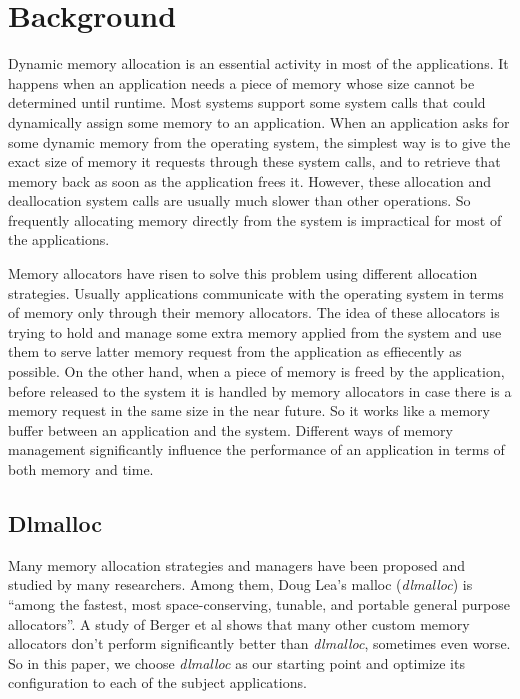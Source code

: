 \section{Background}

Dynamic memory allocation is an essential activity in most of the applications. It happens when an application needs a piece of memory whose size cannot be determined until runtime. Most systems support some system calls that could dynamically assign some memory to an application. When an application asks for some dynamic memory from the operating system, the simplest way is to give the exact size of memory it requests through these system calls, and to retrieve that memory back as soon as the application frees it. However, these allocation and deallocation system calls are usually much slower than other operations. So frequently allocating memory directly from the system is impractical for most of the applications. 

Memory allocators have risen to solve this problem using different allocation strategies. Usually applications communicate with the operating system in terms of memory only through their memory allocators. The idea of these allocators is trying to hold and manage some extra memory applied from the system and use them to serve latter memory request from the application as effiecently as possible. On the other hand, when a piece of memory is freed by the application, before released to the system it is handled by memory allocators in case there is a memory request in the same size in the near future. So it works like a memory buffer between an application and the system. Different ways of memory management significantly influence the performance of an application in terms of both memory and time.

\subsection{Dlmalloc}

Many memory allocation strategies and managers have been proposed and studied by many researchers. Among them, Doug Lea's malloc (\emph{dlmalloc}) \cite{lea1996memory} is ``among the fastest, most space-conserving, tunable, and portable general purpose allocators''. A study of Berger et al\cite{Berger:2002:RCM:583854.582421} shows that many other custom memory allocators don't perform significantly better than \emph{dlmalloc}, sometimes even worse. So in this paper, we choose \emph{dlmalloc} as our starting point and optimize its configuration to each of the subject applications.

